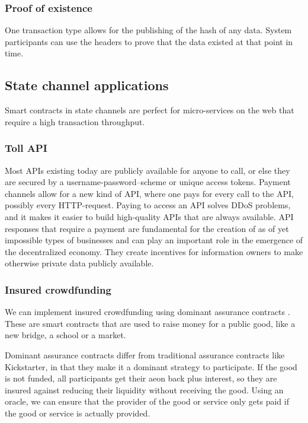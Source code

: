 \documentclass[a4paper, 10pt, conference]{ieeeconf}      %
\begin{document}
\begin{draft}
\subsubsection{Proof of existence}
One transaction type allows for the publishing of the hash of any data. System participants can use the headers to prove that the data existed at that point in time.


\subsection{State channel applications}
Smart contracts in state channels are perfect for micro-services on the web that require a high transaction throughput. 


\subsubsection{Toll API}
Most APIs existing today are publicly available for anyone to call, or else they are secured by a username-password--scheme or unique access tokens. %
Payment channels allow for a new kind of API, where one pays for every call to the API, possibly every HTTP-request. Paying to access an API solves DDoS problems, and it makes it easier to build high-quality APIs that are always available. API responses that require a payment are fundamental for the creation of as of yet impossible types of businesses and can play an important role in the emergence of the decentralized economy. They create incentives for information owners to make otherwise private data publicly available.

\subsubsection{Insured crowdfunding}
We can implement insured crowdfunding using dominant assurance contracts \source. These are smart contracts that are used to raise money for a public good, like a new bridge, a school or a market.

Dominant assurance contracts differ from traditional assurance contracts like Kickstarter, in that they make it a dominant strategy to participate. If the good is not funded, all participants get their aeon back plus interest, so they are insured against reducing their liquidity without receiving the good. Using an oracle, we can ensure that the provider of the good or service only gets paid if the good or service is actually provided. 


\end{draft}
\end{document}
